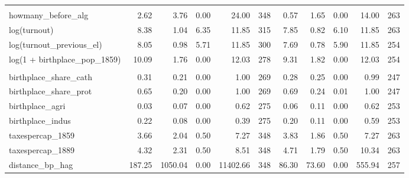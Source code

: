 \begin{table}[!h]
{\begin{threeparttable}
\begin{tabular}[t]{lrrrrrrrrrr}
\addlinespace[0.3em]
\multicolumn{11}{l}{\textbf{Panel C: Election Characteristics}}\\
\hspace{1em}howmany\_before\_alg & \num{2.62} & \num{3.76} & \num{0.00} & \num{24.00} & 348 & \num{0.57} & \num{1.65} & \num{0.00} & \num{14.00} & 263\\
\hspace{1em}log(turnout) & \num{8.38} & \num{1.04} & \num{6.35} & \num{11.85} & 315 & \num{7.85} & \num{0.82} & \num{6.10} & \num{11.85} & 263\\
\hspace{1em}log(turnout\_previous\_el) & \num{8.05} & \num{0.98} & \num{5.71} & \num{11.85} & 300 & \num{7.69} & \num{0.78} & \num{5.90} & \num{11.85} & 254\\
\hspace{1em}log(1 + birthplace\_pop\_1859) & \num{10.09} & \num{1.76} & \num{0.00} & \num{12.03} & 278 & \num{9.31} & \num{1.82} & \num{0.00} & \num{12.03} & 254\\
\addlinespace[0.3em]
\multicolumn{11}{l}{\textbf{Panel D: Birthplace Characteristics}}\\
\hspace{1em}birthplace\_share\_cath & \num{0.31} & \num{0.21} & \num{0.00} & \num{1.00} & 269 & \num{0.28} & \num{0.25} & \num{0.00} & \num{0.99} & 247\\
\hspace{1em}birthplace\_share\_prot & \num{0.65} & \num{0.20} & \num{0.00} & \num{1.00} & 269 & \num{0.69} & \num{0.24} & \num{0.01} & \num{1.00} & 247\\
\hspace{1em}birthplace\_agri & \num{0.03} & \num{0.07} & \num{0.00} & \num{0.62} & 275 & \num{0.06} & \num{0.11} & \num{0.00} & \num{0.62} & 253\\
\hspace{1em}birthplace\_indus & \num{0.22} & \num{0.08} & \num{0.00} & \num{0.39} & 275 & \num{0.20} & \num{0.11} & \num{0.00} & \num{0.59} & 253\\
\hspace{1em}taxespercap\_1859 & \num{3.66} & \num{2.04} & \num{0.50} & \num{7.27} & 348 & \num{3.83} & \num{1.86} & \num{0.50} & \num{7.27} & 263\\
\hspace{1em}taxespercap\_1889 & \num{4.32} & \num{2.31} & \num{0.50} & \num{8.51} & 348 & \num{4.71} & \num{1.79} & \num{0.50} & \num{10.34} & 263\\
\hspace{1em}distance\_bp\_hag & \num{187.25} & \num{1050.04} & \num{0.00} & \num{11402.66} & 348 & \num{86.30} & \num{73.60} & \num{0.00} & \num{555.94} & 257\\

\end{tabular}
\end{threeparttable}}
\end{table}
